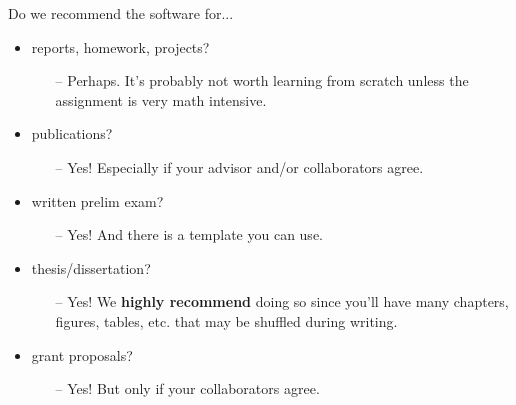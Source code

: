\documentclass{beamer}
\begin{document}
\begin{frame}{Do we recommend the software for...}
    \begin{itemize}
        \item reports, homework, projects?
        \begin{itemize}
            \item[--] Perhaps. It's probably not worth learning from scratch unless the assignment is very math intensive.
        \end{itemize}
        \item publications?
            \begin{itemize}
                \item[--] Yes! Especially if your advisor and/or collaborators agree.
            \end{itemize}
        \item written prelim exam?
            \begin{itemize}
                \item[--] Yes! And there is a template you can use.
            \end{itemize}
        \item thesis/dissertation?
            \begin{itemize}
                \item[--] Yes! We \textbf{highly recommend} doing so since you'll have many chapters, figures, tables, etc. that may be shuffled during writing. 
            \end{itemize}
        \item grant proposals?
            \begin{itemize}
                \item[--] Yes! But only if your collaborators agree.
            \end{itemize}
    \end{itemize}
\end{frame}
    
\end{document}

